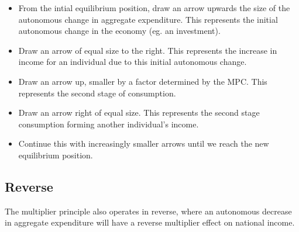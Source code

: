 \documentclass[a4paper,11pt]{article}
\begin{document}
\begin{itemize}
\item From the intial equilibrium position, draw an arrow upwards the size of
	the autonomous change in aggregate expenditure. This represents the initial
	autonomous change in the economy (eg. an investment).
\item Draw an arrow of equal size to the right. This represents the increase in
	income for an individual due to this initial autonomous change.
\item Draw an arrow up, smaller by a factor determined by the MPC. This
	represents the second stage of consumption.
\item Draw an arrow right of equal size. This represents the second stage
	consumption forming another individual's income.
\item Continue this with increasingly smaller arrows until we reach the new
	equilibrium position.
\end{itemize}


\subsection{Reverse}

The multiplier principle also operates in reverse, where an autonomous decrease
in aggregate expenditure will have a reverse multiplier effect on national
income.
\end{document}
